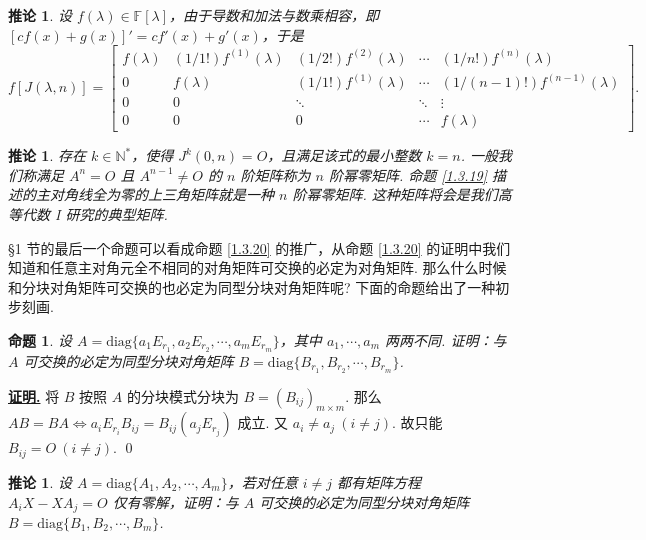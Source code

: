 \documentclass[10pt,openany]{article}
\theoremstyle{thmstyle} %
\theoremstyle{defstyle} %
\newtheorem{corollary}[theorem]{推论}
\theoremstyle{prostyle} %
\newtheorem{proposition}[theorem]{命题}
\theoremstyle{exastyle}
\theoremstyle{remstyle}
\renewenvironment{proof}[1][证明]{\par\underline{\textbf{#1.}} \;\fangsong}{\qed\par}
\newcommand{\F}{\mathbb{F}}
\newcommand{\diag}{\mathrm{diag}}
\begin{document}
\begin{corollary}
	设 \( f(\lambda) \in \F[\lambda] \)，由于导数和加法与数乘相容，即 \( [cf(x)+g(x)]'=cf'(x)+g'(x) \)，于是
	\[ f[J(\lambda,n)]= \begin{bmatrix}
		f(\lambda) & (1/1!)f^{(1)}(\lambda) & (1/2!)f^{(2)}(\lambda) & \cdots & (1/n!)f^{(n)}(\lambda) \\
		0 & f(\lambda) & (1/1!)f^{(1)}(\lambda) & \cdots &  (1/(n-1)!)f^{(n-1)}(\lambda) \\
		0 & 0 & \ddots & \ddots &  \vdots \\
		0 & 0 & 0 & \cdots &  f(\lambda)
	\end{bmatrix}. \] 
\end{corollary}

\begin{corollary}
	存在 \( k \in \mathbb{N}^* \)，使得 \( J^k(0,n)=O \)，且满足该式的最小整数 \( k=n \). 一般我们称满足 \( A^n=O \) 且 \( A^{n-1} \neq O \) 的 \( n \) 阶矩阵称为 \( n \) 阶幂零矩阵. 命题 \ref{1.3.19} 描述的主对角线全为零的上三角矩阵就是一种 \( n \) 阶幂零矩阵. 这种矩阵将会是我们高等代数 I 研究的典型矩阵.
\end{corollary}

\S 1 节的最后一个命题可以看成命题 \ref{1.3.20} 的推广，从命题 \ref{1.3.20} 的证明中我们知道和任意主对角元全不相同的对角矩阵可交换的必定为对角矩阵. 那么什么时候和分块对角矩阵可交换的也必定为同型分块对角矩阵呢? 下面的命题给出了一种初步刻画.

\begin{proposition}
	设 \( A=\diag\{ a_1E_{r_1},a_2E_{r_2},\cdots,a_mE_{r_m}\} \)，其中 \( a_1,\cdots,a_m \) 两两不同. 证明：与 \( A \) 可交换的必定为同型分块对角矩阵 \( B=\diag\{B_{r_1},B_{r_2},\cdots,B_{r_m}\} \).
\end{proposition}

\begin{proof}
	将 \( B \) 按照 \( A \) 的分块模式分块为 \( B=(B_{ij})_{m \times m} \). 那么 \( AB=BA \Leftrightarrow a_iE_{r_i}B_{ij}=B_{ij}(a_jE_{r_j}) \) 成立. 又 \( a_i \neq a_j \ (i \neq j) \). 故只能 \( B_{ij}=O \ (i \neq j) \).
\end{proof}

\begin{corollary}	\label{1.4.10}
	设 \( A=\diag\{ A_1,A_2,\cdots,A_m\} \)，若对任意 \( i \neq j \) 都有矩阵方程 \( A_iX-XA_j=O \) 仅有零解，证明：与 \( A \) 可交换的必定为同型分块对角矩阵 \( B=\diag\{B_1,B_2,\cdots,B_m\} \).

\end{corollary}
\end{document}
